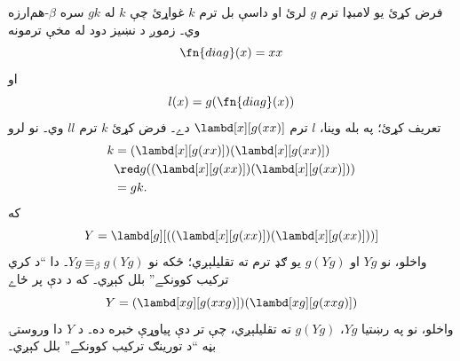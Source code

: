 \documentclass[../../../include/open-logic-section]{subfiles}
\begin{document}

فرض کړئ يو لامبډا ترم $g$ لرئ او داسې بل ترم $k$ غواړئ چې $k$ له
$gk$ سره $\beta$-هم‌ارزه وي۔ زموږ د نښيز دود له مخې ترمونه
\[
\fn{diag}(x) = xx
\]
او
\[
l(x) = g(\fn{diag}(x))
\]
تعريف کړئ؛ په بله وينا، $l$ ترم $\lambd[x][g(xx)]$ دے۔ فرض کړئ
$k$ ترم $ll$ وي۔ نو لرو
\begin{align*}
k & = (\lambd[x][g(xx)])(\lambd[x][g(xx)]) \\
& \red  g((\lambd[x][g(xx)])(\lambd[x][g(xx)])) \\
& = gk.
\end{align*}
که
\[
Y = \lambd[g][((\lambd[x][g(xx)])(\lambd[x][g(xx)]))]
\]
واخلو، نو $Yg$ او $g(Yg)$ يو ګډ ترم ته تقليلېږي؛ ځکه نو $Yg
\equiv_\beta g(Yg)$۔ دا ``د کري ترکيب کوونکے'' بلل کېږي۔ که د دې
پر ځاے
\[
Y = (\lambd[xg][g(xxg)])(\lambd[xg][g(xxg)])
\]
واخلو، نو په رښتيا $Yg$، $g(Yg)$ ته تقليلېږي، چې تر دې پياوړې
خبره ده۔ د $Y$ دا وروستۍ بڼه ``د تورينګ ترکيب کوونکے'' بلل کېږي۔
\end{document}
